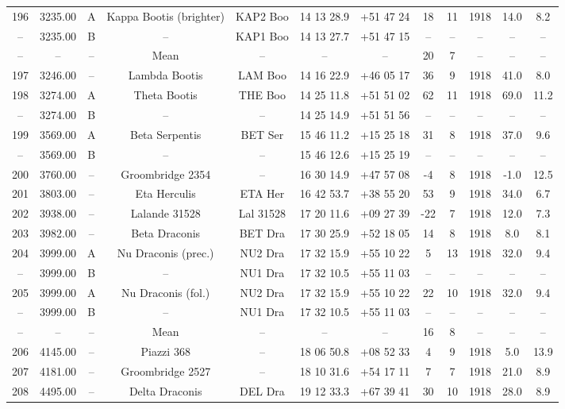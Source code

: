 \begin{table}
\begin{tabular}{cccccccccccc}
196 & 3235.00 & A & Kappa Bootis (brighter) & KAP2 Boo & 14 13 28.9 & +51 47 24 & 18 & 11 & 1918 & 14.0 & 8.2 \\
-- & 3235.00 & B & -- & KAP1 Boo & 14 13 27.7 & +51 47 15 & -- & -- & -- & -- & -- \\
-- & -- & -- & Mean & -- & -- & -- & 20 & 7 & -- & -- & -- \\
197 & 3246.00 & -- & Lambda Bootis & LAM Boo & 14 16 22.9 & +46 05 17 & 36 & 9 & 1918 & 41.0 & 8.0 \\
198 & 3274.00 & A & Theta Bootis & THE Boo & 14 25 11.8 & +51 51 02 & 62 & 11 & 1918 & 69.0 & 11.2 \\
-- & 3274.00 & B & -- & -- & 14 25 14.9 & +51 51 56 & -- & -- & -- & -- & -- \\
199 & 3569.00 & A & Beta Serpentis & BET Ser & 15 46 11.2 & +15 25 18 & 31 & 8 & 1918 & 37.0 & 9.6 \\
-- & 3569.00 & B & -- & -- & 15 46 12.6 & +15 25 19 & -- & -- & -- & -- & -- \\
200 & 3760.00 & -- & Groombridge 2354 & -- & 16 30 14.9 & +47 57 08 & -4 & 8 & 1918 & -1.0 & 12.5 \\
201 & 3803.00 & -- & Eta Herculis & ETA Her & 16 42 53.7 & +38 55 20 & 53 & 9 & 1918 & 34.0 & 6.7 \\
202 & 3938.00 & -- & Lalande 31528 & Lal 31528 & 17 20 11.6 & +09 27 39 & -22 & 7 & 1918 & 12.0 & 7.3 \\
203 & 3982.00 & -- & Beta Draconis & BET Dra & 17 30 25.9 & +52 18 05 & 14 & 8 & 1918 & 8.0 & 8.1 \\
204 & 3999.00 & A & Nu Draconis (prec.) & NU2 Dra & 17 32 15.9 & +55 10 22 & 5 & 13 & 1918 & 32.0 & 9.4 \\
-- & 3999.00 & B & -- & NU1 Dra & 17 32 10.5 & +55 11 03 & -- & -- & -- & -- & -- \\
205 & 3999.00 & A & Nu Draconis (fol.) & NU2 Dra & 17 32 15.9 & +55 10 22 & 22 & 10 & 1918 & 32.0 & 9.4 \\
-- & 3999.00 & B & -- & NU1 Dra & 17 32 10.5 & +55 11 03 & -- & -- & -- & -- & -- \\
-- & -- & -- & Mean & -- & -- & -- & 16 & 8 & -- & -- & -- \\
206 & 4145.00 & -- & Piazzi 368 & -- & 18 06 50.8 & +08 52 33 & 4 & 9 & 1918 & 5.0 & 13.9 \\
207 & 4181.00 & -- & Groombridge 2527 & -- & 18 10 31.6 & +54 17 11 & 7 & 7 & 1918 & 21.0 & 8.9 \\
208 & 4495.00 & -- & Delta Draconis & DEL Dra & 19 12 33.3 & +67 39 41 & 30 & 10 & 1918 & 28.0 & 8.9 \\

\end{tabular}
\end{table}
